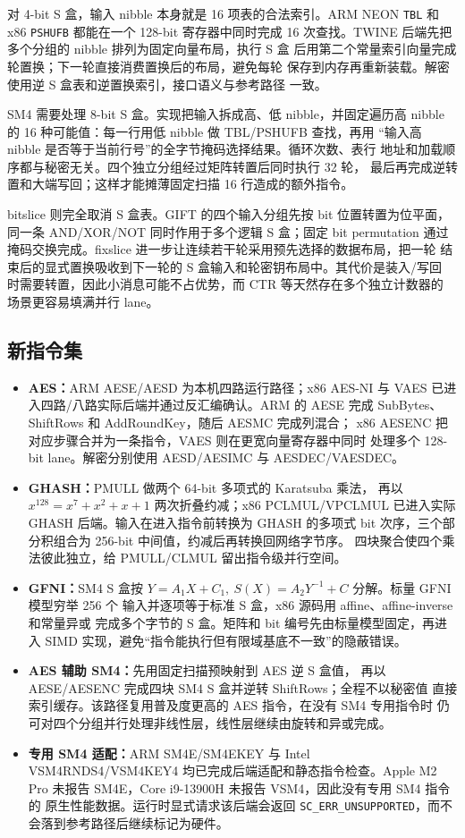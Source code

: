 \documentclass[11pt,a4paper,UTF8,fontset=none]{ctexart}
\begin{document}
对 4-bit S 盒，输入 nibble 本身就是 16 项表的合法索引。ARM NEON
\texttt{TBL} 和 x86 \texttt{PSHUFB} 都能在一个 128-bit 寄存器中同时完成
16 次查找。TWINE 后端先把多个分组的 nibble 排列为固定向量布局，执行 S 盒
后用第二个常量索引向量完成轮置换；下一轮直接消费置换后的布局，避免每轮
保存到内存再重新装载。解密使用逆 S 盒表和逆置换索引，接口语义与参考路径
一致。

SM4 需要处理 8-bit S 盒。实现把输入拆成高、低 nibble，并固定遍历高
nibble 的 16 种可能值：每一行用低 nibble 做 TBL/PSHUFB 查找，再用
“输入高 nibble 是否等于当前行号”的全字节掩码选择结果。循环次数、表行
地址和加载顺序都与秘密无关。四个独立分组经过矩阵转置后同时执行 32 轮，
最后再完成逆转置和大端写回；这样才能摊薄固定扫描 16 行造成的额外指令。

bitslice 则完全取消 S 盒表。GIFT 的四个输入分组先按 bit 位置转置为位平面，
同一条 AND/XOR/NOT 同时作用于多个逻辑 S 盒；固定 bit permutation 通过
掩码交换完成。fixslice 进一步让连续若干轮采用预先选择的数据布局，把一轮
结束后的显式置换吸收到下一轮的 S 盒输入和轮密钥布局中。其代价是装入/写回
时需要转置，因此小消息可能不占优势，而 CTR 等天然存在多个独立计数器的
场景更容易填满并行 lane。

\subsection{新指令集}

\begin{itemize}
  \item \textbf{AES：}ARM AESE/AESD 为本机四路运行路径；x86 AES-NI
  与 VAES 已进入四路/八路实际后端并通过反汇编确认。ARM 的 AESE
  完成 SubBytes、ShiftRows 和 AddRoundKey，随后 AESMC 完成列混合；
  x86 AESENC 把对应步骤合并为一条指令，VAES 则在更宽向量寄存器中同时
  处理多个 128-bit lane。解密分别使用 AESD/AESIMC 与 AESDEC/VAESDEC。
  \item \textbf{GHASH：}PMULL 做两个 64-bit 多项式的 Karatsuba 乘法，
  再以 $x^{128}=x^7+x^2+x+1$ 两次折叠约减；x86 PCLMUL/VPCLMUL
  已进入实际 GHASH 后端。输入在进入指令前转换为 GHASH 的多项式 bit
  次序，三个部分积组合为 256-bit 中间值，约减后再转换回网络字节序。
  四块聚合使四个乘法彼此独立，给 PMULL/CLMUL 留出指令级并行空间。
  \item \textbf{GFNI：}SM4 S 盒按
  $Y=A_1X+C_1,\ S(X)=A_2Y^{-1}+C$ 分解。标量 GFNI 模型穷举 256 个
  输入并逐项等于标准 S 盒，x86 源码用 affine、affine-inverse 和常量异或
  完成多个字节的 S 盒。矩阵和 bit 编号先由标量模型固定，再进入 SIMD
  实现，避免“指令能执行但有限域基底不一致”的隐蔽错误。
  \item \textbf{AES 辅助 SM4：}先用固定扫描预映射到 AES 逆 S 盒值，
  再以 AESE/AESENC 完成四块 SM4 S 盒并逆转 ShiftRows；全程不以秘密值
  直接索引缓存。该路径复用普及度更高的 AES 指令，在没有 SM4 专用指令时
  仍可对四个分组并行处理非线性层，线性层继续由旋转和异或完成。
  \item \textbf{专用 SM4 适配：}ARM SM4E/SM4EKEY 与 Intel
  VSM4RNDS4/VSM4KEY4 均已完成后端适配和静态指令检查。Apple M2 Pro
  未报告 SM4E，Core i9-13900H 未报告 VSM4，因此没有专用 SM4 指令的
  原生性能数据。运行时显式请求该后端会返回
  \texttt{SC\_ERR\_UNSUPPORTED}，而不会落到参考路径后继续标记为硬件。
\end{itemize}
\end{document}
